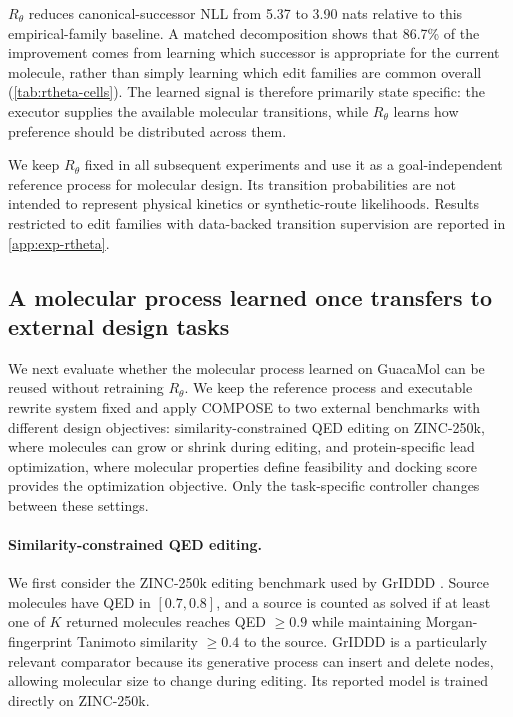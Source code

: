 $R_\theta$ reduces canonical-successor NLL from 5.37 to 3.90 nats relative to
this empirical-family baseline. A matched decomposition shows that 86.7\% of the
improvement comes from learning which successor is appropriate for the current
molecule, rather than simply learning which edit families are common overall
(\cref{tab:rtheta-cells}). The learned signal is therefore primarily state
specific: the executor supplies the available molecular transitions, while
$R_\theta$ learns how preference should be distributed across them.

We keep $R_\theta$ fixed in all subsequent experiments and use it as a
goal-independent reference process for molecular design. Its transition
probabilities are not intended to represent physical kinetics or synthetic-route
likelihoods. Results restricted to edit families with data-backed transition
supervision are reported in \cref{app:exp-rtheta}.

\subsection{A molecular process learned once transfers to external design tasks}
\label{sec:gem-exp-external}

We next evaluate whether the molecular process learned on GuacaMol can be reused
without retraining $R_\theta$. We keep the reference process and executable
rewrite system fixed and apply COMPOSE to two external benchmarks with different
design objectives: similarity-constrained QED editing on ZINC-250k, where
molecules can grow or shrink during editing, and protein-specific lead
optimization, where molecular properties define feasibility and docking score
provides the optimization objective. Only the task-specific controller changes
between these settings.

\paragraph{Similarity-constrained QED editing.}
We first consider the ZINC-250k editing benchmark used by GrIDDD
\citep{ninniri2025griddd}. Source molecules have QED in $[0.7,0.8]$, and a source
is counted as solved if at least one of $K$ returned molecules reaches QED
$\geq 0.9$ while maintaining Morgan-fingerprint Tanimoto similarity $\geq 0.4$ to
the source. GrIDDD is a particularly relevant comparator because its generative
process can insert and delete nodes, allowing molecular size to change during
editing. Its reported model is trained directly on ZINC-250k.

